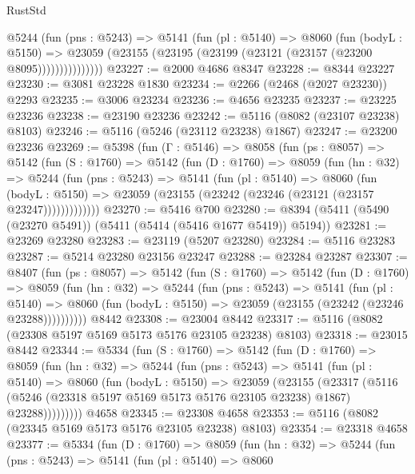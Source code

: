 \begin{lexlean}{RustStd}
\begin{coremodule}
              @5244
                (fun (pns : @5243) =>
                @5141
                  (fun (pl : @5140) =>
                  @8060
                    (fun (bodyL : @5150) =>
                    @23059 (@23155 (@23195 (@23199 (@23121 (@23157 (@23200 @8095)))))))))))))))
@23227 := @2000 @4686 @8347
@23228 := @8344 @23227
@23230 := @3081 @23228 @1830
@23234 := @2266 (@2468 (@2027 @23230)) @2293
@23235 := @3006 @23234
@23236 := @4656 @23235
@23237 := @23225 @23236
@23238 := @23190 @23236
@23242 := @5116 (@8082 (@23107 @23238) @8103)
@23246 := @5116 (@5246 (@23112 @23238) @1867)
@23247 := @23200 @23236
@23269 := @5398
    (fun (Γ : @5146) =>
    @8058
      (fun (ps : @8057) =>
      @5142
        (fun (S : @1760) =>
        @5142
          (fun (D : @1760) =>
          @8059
            (fun (hn : @32) =>
            @5244
              (fun (pns : @5243) =>
              @5141
                (fun (pl : @5140) =>
                @8060
                  (fun (bodyL : @5150) =>
                  @23059 (@23155 (@23242 (@23246 (@23121 (@23157 @23247)))))))))))))
@23270 := @5416 @700
@23280 := @8394 (@5411 (@5490 (@23270 @5491)) (@5411 (@5414 (@5416 @1677 @5419)) @5194))
@23281 := @23269 @23280
@23283 := @23119 (@5207 @23280)
@23284 := @5116 @23283
@23287 := @5214 @23280 @23156 @23247
@23288 := @23284 @23287
@23307 := @8407
    (fun (ps : @8057) =>
    @5142
      (fun (S : @1760) =>
      @5142
        (fun (D : @1760) =>
        @8059
          (fun (hn : @32) =>
          @5244
            (fun (pns : @5243) =>
            @5141
              (fun (pl : @5140) =>
              @8060 (fun (bodyL : @5150) => @23059 (@23155 (@23242 (@23246 @23288))))))))))
    @8442
@23308 := @23004 @8442
@23317 := @5116 (@8082 (@23308 @5197 @5169 @5173 @5176 @23105 @23238) @8103)
@23318 := @23015 @8442
@23344 := @5334
    (fun (S : @1760) =>
    @5142
      (fun (D : @1760) =>
      @8059
        (fun (hn : @32) =>
        @5244
          (fun (pns : @5243) =>
          @5141
            (fun (pl : @5140) =>
            @8060
              (fun (bodyL : @5150) =>
              @23059
                (@23155
                  (@23317
                    (@5116
                      (@5246 (@23318 @5197 @5169 @5173 @5176 @23105 @23238) @1867)
                      @23288)))))))))
    @4658
@23345 := @23308 @4658
@23353 := @5116 (@8082 (@23345 @5169 @5173 @5176 @23105 @23238) @8103)
@23354 := @23318 @4658
@23377 := @5334
    (fun (D : @1760) =>
    @8059
      (fun (hn : @32) =>
      @5244
        (fun (pns : @5243) =>
        @5141
          (fun (pl : @5140) =>
          @8060

\end{coremodule}
\end{lexlean}
